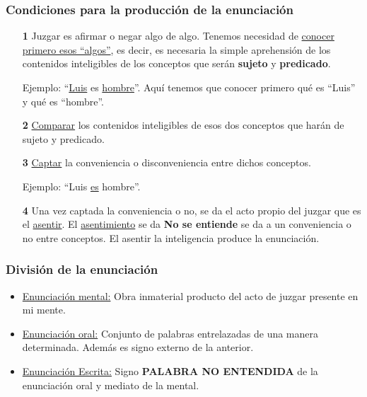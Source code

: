 \documentclass{article}
\begin{document}
\subsubsection{Condiciones para la producción de la enunciación}
\begin{enumerate}
     \item[\textbf{1}] Juzgar es afirmar o negar algo de algo. Tenemos necesidad de \underline{conocer primero esos ``algos''}, es decir, es necesaria la simple aprehensión de los contenidos inteligibles de los conceptos que serán \textbf{sujeto} y \textbf{predicado}. \par
        Ejemplo: ``\underline{Luis} es \underline{hombre}''. Aquí tenemos que conocer primero qué es ``Luis'' y qué es ``hombre''.
        \item[\textbf{2}] \underline{Comparar} los contenidos inteligibles de esos dos conceptos que harán de sujeto y predicado.
        \item[\textbf{3}] \underline{Captar} la conveniencia o disconveniencia entre dichos conceptos. \par 
        Ejemplo: ``Luis \underline{es} hombre''.
        \item[\textbf{4}] Una vez captada la conveniencia o no, se da el acto propio del juzgar que es el \underline{asentir}. El \underline{asentimiento} se da \textbf{No se entiende} se da a un conveniencia o no entre conceptos. El asentir la inteligencia produce la enunciación.

\end{enumerate}

\subsubsection{División de la enunciación}
  \begin{itemize}
        \item \underline{Enunciación mental:} Obra inmaterial producto del acto de juzgar presente en mi mente.
        \item \underline{Enunciación oral:} Conjunto de palabras entrelazadas de una manera determinada. Además es signo externo de la anterior.
       \item \underline{Enunciación Escrita:} Signo \textbf{PALABRA NO ENTENDIDA} de la enunciación oral y mediato de la mental.
    \end{itemize}
\end{document}
